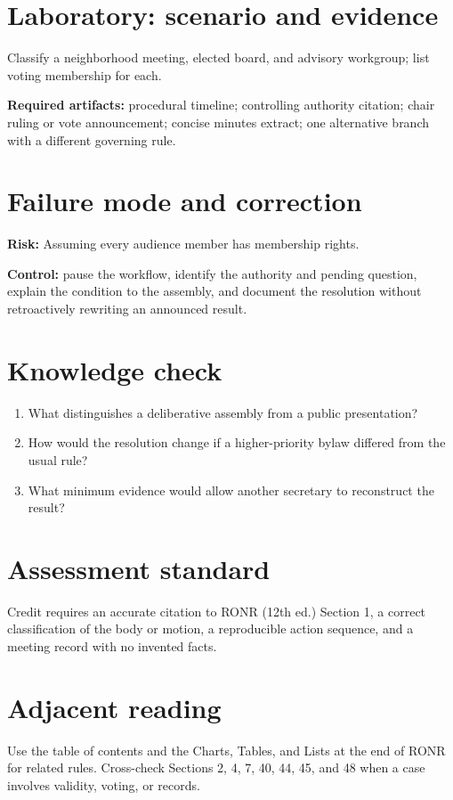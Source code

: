 \documentclass[11pt]{article}
\begin{document}
\section{Laboratory: scenario and evidence}
Classify a neighborhood meeting, elected board, and advisory workgroup; list voting membership for each.

\textbf{Required artifacts:} procedural timeline; controlling authority citation; chair ruling or vote announcement; concise minutes extract; one alternative branch with a different governing rule.

\section{Failure mode and correction}
\textbf{Risk:} Assuming every audience member has membership rights.

\textbf{Control:} pause the workflow, identify the authority and pending question, explain the condition to the assembly, and document the resolution without retroactively rewriting an announced result.

\section{Knowledge check}
\begin{enumerate}[leftmargin=*,itemsep=4pt]
\item What distinguishes a deliberative assembly from a public presentation?
\item How would the resolution change if a higher-priority bylaw differed from the usual rule?
\item What minimum evidence would allow another secretary to reconstruct the result?
\end{enumerate}

\section{Assessment standard}
Credit requires an accurate citation to RONR (12th ed.) Section 1, a correct classification of the body or motion, a reproducible action sequence, and a meeting record with no invented facts.

\section{Adjacent reading}
Use the table of contents and the Charts, Tables, and Lists at the end of RONR for related rules. Cross-check Sections 2, 4, 7, 40, 44, 45, and 48 when a case involves validity, voting, or records.
\end{document}
